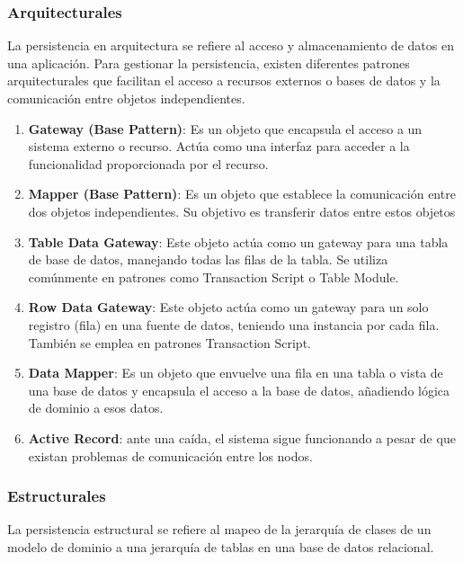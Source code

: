 \documentclass{article}
\begin{document}
		\subsubsection{Arquitecturales}
		La persistencia en arquitectura se refiere al acceso y almacenamiento de datos en una aplicación. Para gestionar la persistencia, existen diferentes patrones arquitecturales que facilitan el acceso a recursos externos o bases de datos y la comunicación entre objetos independientes.
		\begin{enumerate}
			\item {\textbf{Gateway (Base Pattern)}}: Es un objeto que encapsula el acceso a un sistema externo o recurso. Actúa como una interfaz para acceder a la funcionalidad proporcionada por el recurso.
			
			
			
			\item {\textbf{Mapper (Base Pattern)}}:  Es un objeto que establece la comunicación entre dos objetos independientes. Su objetivo es transferir datos entre estos objetos
			
			\item {\textbf{Table Data Gateway}}: Este objeto actúa como un gateway para una tabla de base de datos, manejando todas las filas de la tabla. Se utiliza comúnmente en patrones como Transaction Script o Table Module.

            \item {\textbf{Row Data Gateway}}: Este objeto actúa como un gateway para un solo registro (fila) en una fuente de datos, teniendo una instancia por cada fila. También se emplea en patrones Transaction Script.
			
			\item {\textbf{Data Mapper}}: Es un objeto que envuelve una fila en una tabla o vista de una base de datos y encapsula el acceso a la base de datos, añadiendo lógica de dominio a esos datos. 
			
			
			
			\item {\textbf{Active Record}}: ante una caída, el sistema sigue funcionando a pesar de que existan problemas de comunicación entre los nodos.
		\end{enumerate}
		
		
		\subsubsection{Estructurales}
		La persistencia estructural se refiere al mapeo de la jerarquía de clases de un modelo de dominio a una jerarquía de tablas en una base de datos relacional.
\end{document}
